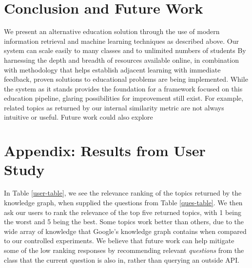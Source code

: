 \documentclass[11pt,a4paper]{article}
\begin{document}
\section{Conclusion and Future Work}

We present an alternative education solution through the use of modern information retrieval and machine learning techniques as described above. Our system can scale easily to many classes and to unlimited numbers of students By harnessing the depth and breadth of resources available online, in combination with methodology that helps establish adjacent learning with immediate feedback, proven solutions to educational problems are being implemented. While the system as it stands provides the foundation for a framework focused on this education pipeline, glaring possibilities for improvement still exist. For example, related topics as returned by our internal similarity metric are not always intuitive or useful. Future work could also explore




\appendix

\section{Appendix: Results from User Study}

In Table \ref{user-table}, we see the relevance ranking of the topics returned by the knowledge graph, when supplied the questions from Table \ref{ques-table}. We then ask our users to rank the relevance of the top five returned topics, with 1 being the worst and 5 being the best. Some topics work better than others, due to the wide array of knowledge that Google's knowledge graph contains when compared to our controlled experiments. We believe that future work can help mitigate some of the low ranking responses by recommending relevant \textit{questions} from the class that the current question is also in, rather than querying an outside API.
\end{document}
